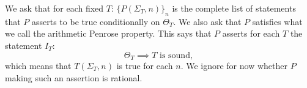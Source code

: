 \documentclass{amsart}  %
\newenvironment{itquote}
  {\begin{quote}\itshape}
  {\end{quote}\ignorespacesafterend}
\numberwithin{equation}{section}
\theoremstyle{definition}
\theoremstyle{remark}
\begin{document}
{We ask that for each fixed $T$: 
$\{P (\Sigma _{T},n)\} _{n} $ is the complete list of statements that $P$ asserts to be true conditionally on $\Theta _{T} $. 
We also ask that $P$ satisfies what we call the arithmetic Penrose property. This says that $P$ asserts for each $T$ the statement $I _{T}$:
\begin{equation} \label{eq:Theta}
\Theta _{T} \implies T \text{ is sound},
\end{equation}
which means that $T (\Sigma _{T},n)$ is true for each $n$. 
We ignore for now whether $P$ making such an assertion is rational.
%

}
\end{document}
